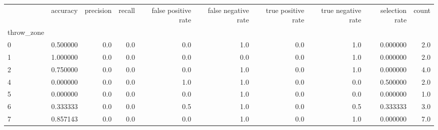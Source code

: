\begin{tabular}{lrrrrrrrrr}
\toprule
{} &  accuracy &  precision &  recall &  false positive rate &  false negative rate &  true positive rate &  true negative rate &  selection rate &  count \\
throw\_zone &           &            &         &                      &                      &                     &                     &                 &        \\
\midrule
0          &  0.500000 &        0.0 &     0.0 &                  0.0 &                  1.0 &                 0.0 &                 1.0 &        0.000000 &    2.0 \\
1          &  1.000000 &        0.0 &     0.0 &                  0.0 &                  0.0 &                 0.0 &                 1.0 &        0.000000 &    2.0 \\
2          &  0.750000 &        0.0 &     0.0 &                  0.0 &                  1.0 &                 0.0 &                 1.0 &        0.000000 &    4.0 \\
4          &  0.000000 &        0.0 &     0.0 &                  1.0 &                  1.0 &                 0.0 &                 0.0 &        0.500000 &    2.0 \\
5          &  0.000000 &        0.0 &     0.0 &                  0.0 &                  1.0 &                 0.0 &                 0.0 &        0.000000 &    1.0 \\
6          &  0.333333 &        0.0 &     0.0 &                  0.5 &                  1.0 &                 0.0 &                 0.5 &        0.333333 &    3.0 \\
7          &  0.857143 &        0.0 &     0.0 &                  0.0 &                  1.0 &                 0.0 &                 1.0 &        0.000000 &    7.0 \\
\bottomrule
\end{tabular}
